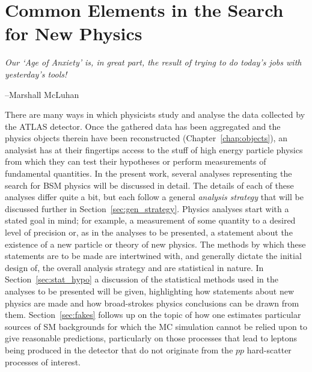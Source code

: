 \chapter{Common Elements in the Search for New Physics}
\label{chap:common_search}

\epigraph{
\textit{Our `Age of Anxiety' is, in great part, the result of trying to do today's jobs with yesterday's tools!}
}{--Marshall McLuhan}



There are many ways in which physicists study and analyse the data collected by
the ATLAS detector.
Once the gathered data has been aggregated and the physics objects therein
have been reconstructed (Chapter~\ref{chap:objects}), an analysist has at their fingertips access
to the stuff of high energy particle physics from which they
can test their hypotheses or perform measurements of fundamental quantities.
In the present work, several analyses representing the search for BSM physics
will be discussed in detail.
The details of each of these analyses differ quite a bit, but each follow
a general \textit{analysis strategy} that will be discussed
further in Section~\ref{sec:gen_strategy}.
Physics analyses start with a stated goal in mind; for example,
a measurement of some quantity to a desired level of precision
or, as in the analyses to be presented, a statement about the existence of a new particle or theory of new physics.
The methods by which these statements are to be made are intertwined with, and generally
dictate the initial design of, the overall
analysis strategy and are statistical in nature.
In Section~\ref{sec:stat_hypo} a discussion of the statistical methods used
in the analyses to be presented will be given, highlighting how statements about
new physics are made and how broad-strokes physics conclusions can be drawn from them.
Section~\ref{sec:fakes} follows up on the topic of how one estimates particular sources
of SM backgrounds for which the MC simulation cannot be relied upon to give reasonable
predictions, particularly on those processes that lead to leptons being produced in the detector
that do not originate from the $pp$ hard-scatter processes of interest.

